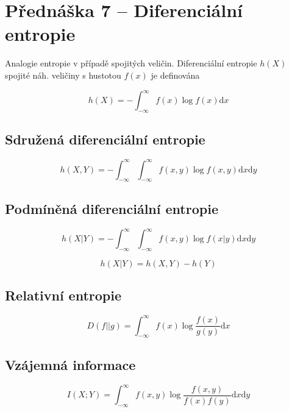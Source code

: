 \section{Přednáška 7 -- Diferenciální entropie}

Analogie entropie v případě spojitých veličin.
Diferenciální entropie $h(X)$ spojité náh. veličiny s hustotou $f(x)$ je definována

$$
    h(X) = - \int_{-\infty}^{\infty}{f(x)\log{f(x)}\textrm{d}x}
$$

\subsection{Sdružená diferenciální entropie}

$$
    h(X,Y) = -\int_{-\infty}^{\infty}{}\int_{-\infty}^{\infty}{f(x,y)\log{f(x,y)}\textrm{d}x \textrm{d}y}
$$

\subsection{Podmíněná diferenciální entropie}

$$
    h(X|Y) = -\int_{-\infty}^{\infty}{}\int_{-\infty}^{\infty}{f(x,y)\log{f(x|y)} \textrm{d}x\textrm{d}y}
$$

$$
    h(X|Y) = h(X,Y) - h(Y)
$$

\subsection{Relativní entropie}

$$
    D(f || g) = \int_{-\infty}^{\infty}{f(x)\log{\frac{f(x)}{g(y)}}\textrm{d}x}
$$

\subsection{Vzájemná informace}

$$
    I(X; Y) = \int_{-\infty}^{\infty}{f(x,y)\log{\frac{f(x,y)}{f(x)f(y)}}\textrm{d}x\textrm{d}y}
$$
